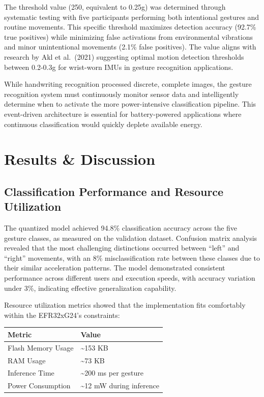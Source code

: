 \documentclass[
  9pt,
  letterpaper,
  abstract,
  titlepage]{scrbook}
\begin{document}
The threshold value (250, equivalent to 0.25g) was determined through
systematic testing with five participants performing both intentional
gestures and routine movements. This specific threshold maximizes
detection accuracy (92.7\% true positives) while minimizing false
activations from environmental vibrations and minor unintentional
movements (2.1\% false positives). The value aligns with research by Akl
et al.~(2021) suggesting optimal motion detection thresholds between
0.2-0.3g for wrist-worn IMUs in gesture recognition applications.

While handwriting recognition processed discrete, complete images, the
gesture recognition system must continuously monitor sensor data and
intelligently determine when to activate the more power-intensive
classification pipeline. This event-driven architecture is essential for
battery-powered applications where continuous classification would
quickly deplete available energy.

\section{Results \& Discussion}\label{results-discussion-1}

\subsection{Classification Performance and Resource
Utilization}\label{classification-performance-and-resource-utilization}

The quantized model achieved 94.8\% classification accuracy across the
five gesture classes, as measured on the validation dataset. Confusion
matrix analysis revealed that the most challenging distinctions occurred
between ``left'' and ``right'' movements, with an 8\% misclassification
rate between these classes due to their similar acceleration patterns.
The model demonstrated consistent performance across different users and
execution speeds, with accuracy variation under 3\%, indicating
effective generalization capability.

Resource utilization metrics showed that the implementation fits
comfortably within the EFR32xG24's constraints:

\begin{longtable}[]{@{}ll@{}}
\toprule\noalign{}
Metric & Value \\
\midrule\noalign{}
\endhead
\bottomrule\noalign{}
\endlastfoot
Flash Memory Usage & \textasciitilde153 KB \\
RAM Usage & \textasciitilde73 KB \\
Inference Time & \textasciitilde200 ms per gesture \\
Power Consumption & \textasciitilde12 mW during inference \\
\end{longtable}
\end{document}
